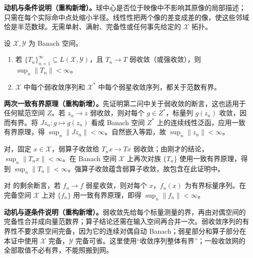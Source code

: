 \documentclass[../../main.tex]{subfiles}
\begin{document}
\begin{remark}
\textbf{动机与条件说明（重构新增）。}球中心是否位于映像中不影响其原像的局部描述；只需在每个实际命中点处缩小半径。线性性把两个像的差变成差的像，使这些邻域恰是半范数球。无需单射、满射、完备性或任何事先给定的 $\mathcal X$ 拓扑。
\end{remark}
\begin{exercise}\label{exercise:ch05-weak-convergent-bounded}
设 $\mathcal X,\mathcal Y$ 为 Banach 空间。
\begin{enumerate}
\item\label{item:ch05-wot-sequence-bounded} 若 $\{T_n\}_{n=1}^{\infty}\subseteq L(\mathcal X,\mathcal Y)$，且 $T_n\to T$ 弱收敛（或强收敛），则 $\sup_n\|T_n\|<\infty$。
\item\label{item:ch05-weak-and-star-sequences-bounded} $\mathcal X$ 中每个弱收敛序列和 $\mathcal X^*$ 中每个弱星收敛序列，都关于范数有界。
\end{enumerate}
\end{exercise}
\begin{solution}
\textbf{两次一致有界原理（重构新增）。}先证明第二问中关于弱收敛的断言，这也适用于任何赋范空间 $Z$。若 $z_n\to z$ 弱收敛，则对每个 $g\in Z^*$，标量列 $g(z_n)$ 收敛，因而有界。将 $Jz_n:g\mapsto g(z_n)$ 看成 Banach 空间 $Z^*$ 上的连续线性泛函，应用一致有界原理，得 $\sup_n\|Jz_n\|<\infty$。自然嵌入等距，故 $\sup_n\|z_n\|<\infty$。

对，固定 $x\in\mathcal X$，弱算子收敛给 $T_nx\to Tx$ 弱收敛；由刚才的结论，$\sup_n\|T_nx\|<\infty$。在 Banach 空间 $\mathcal X$ 上再次对族 $\{T_n\}$ 使用一致有界原理，得到 $\sup_n\|T_n\|<\infty$。强算子收敛蕴含弱算子收敛，故包含在此证明中。

对 的剩余断言，若 $f_n\to f$ 弱星收敛，则对每个 $x$，$f_n(x)$ 为有界标量序列。在完备空间 $\mathcal X$ 上对 $\{f_n\}$ 用一致有界原理，即得 $\sup_n\|f_n\|<\infty$。
\end{solution}
\begin{remark}
\textbf{动机与逐条件说明（重构新增）。}弱收敛先给每个标量测量的界，再由对偶空间的完备性合并成向量范数界；算子结论还需在输入空间再合并一次。弱收敛序列的有界性不要求原空间完备，因为它的连续对偶自动 Banach；弱星部分和算子部分在本证中使用 $\mathcal X$ 完备，$\mathcal Y$ 完备可省。这里使用“收敛序列整体有界”；一般收敛网的全部取值不必有界，不能照搬到网。
\end{remark}
\end{document}
